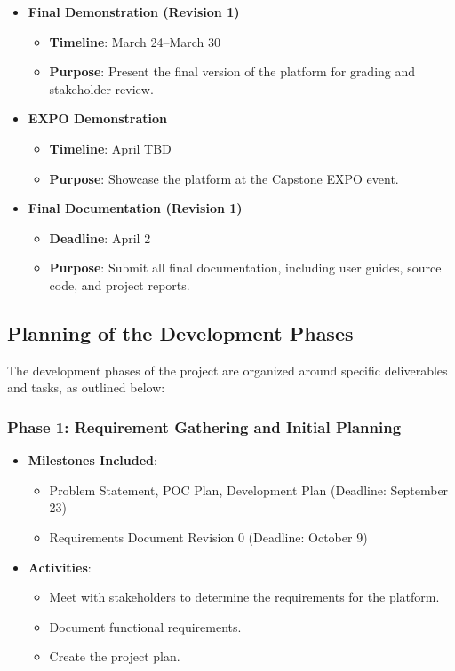 \documentclass[12pt]{article}
\begin{document}
\begin{itemize}
\begin{itemize}
        \end{itemize}
    \item \textbf{Final Demonstration (Revision 1)}
        \begin{itemize}
            \item \textbf{Timeline}: March 24–March 30
            \item \textbf{Purpose}: Present the final version of the platform for grading and stakeholder review.
        \end{itemize}
    \item \textbf{EXPO Demonstration}
        \begin{itemize}
            \item \textbf{Timeline}: April TBD
            \item \textbf{Purpose}: Showcase the platform at the Capstone EXPO event.
        \end{itemize}
    \item \textbf{Final Documentation (Revision 1)}
        \begin{itemize}
            \item \textbf{Deadline}: April 2
            \item \textbf{Purpose}: Submit all final documentation, including user guides, source code, and project reports.
        \end{itemize}
\end{itemize}

\subsection{Planning of the Development Phases}
The development phases of the project are organized around specific deliverables and tasks, as outlined below:

\subsubsection*{Phase 1: Requirement Gathering and Initial Planning}
\begin{itemize}
    \item \textbf{Milestones Included}:
    \begin{itemize}
        \item Problem Statement, POC Plan, Development Plan (Deadline: September 23)
        \item Requirements Document Revision 0 (Deadline: October 9)
    \end{itemize}
    \item \textbf{Activities}:
    \begin{itemize}
        \item Meet with stakeholders to determine the requirements for the platform.
        \item Document functional requirements.
        \item Create the project plan.
    \end{itemize}
\end{itemize}
\end{document}

